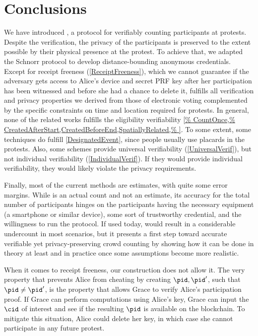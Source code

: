 \section{Conclusions}%
\label{Conclusions}

We have introduced \PRIVO, a protocol for verifiably counting
participants at protests. Despite the verification, the privacy of the
participants is preserved to the extent possible by their physical
presence at the protest. To achieve that, we adapted the Schnorr
protocol to develop distance-bounding anonymous credentials. Except for receipt
freeness (\cref{ReceiptFreeness}), which we cannot guarantee if the adversary gets access to
Alice's device and secret PRF key after her participation has
been witnessed and before she had a chance to
delete it, \PRIVO
fulfills all verification and privacy properties we derived from those
of electronic voting complemented by the specific constraints on time
and location required for protests. 
In general, none of the related works fulfills the eligibility verifiability 
\cref{%
  CountOnce,%
  CreatedAfterStart,CreatedBeforeEnd,SpatiallyRelated,%
}.
To some extent, some techniques do fulfill \cref{DesignatedEvent}, since people 
usually use placards in the protests.
Also, some schemes provide universal verifiability (\cref{UniversalVerif}), but 
not individual verifiability (\cref{IndividualVerif}).
If they would provide individual verifiability, they would likely violate the 
privacy requirements.

Finally, most of the current methods are estimates, with quite some error 
margins. While \PRIVO is an actual count and not an estimate, its
accuracy for the total number of participants hinges on the
participants having the necessary equipment (a smartphone or similar
device), some sort of trustworthy credential, and the willingness to
run the protocol. If used today, \PRIVO would result in a
considerable undercount in most scenarios,  but it presents a first
step toward accurate verifiable yet privacy-preserving crowd counting
by showing how it can be done in theory at least and in practice once
some assumptions become more realistic. 

When it comes to receipt freeness, our construction does not allow it.
The very property that prevents Alice from cheating by creating \(\pid, \pid'\), 
such that \(\pid \neq \pid'\), is the property that allows Grace to verify 
Alice's participation proof.
If Grace can perform computations using Alice's key, Grace can input the 
\(\cid\) of interest and see if the resulting \(\pid\) is available on the 
blockchain.
To mitigate this situation, Alice could delete her key, in which case she cannot 
participate in any future protest.

